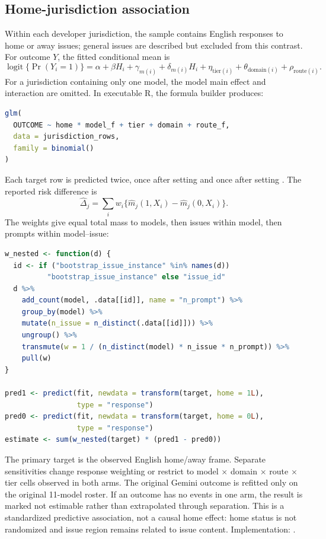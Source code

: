 \documentclass[11pt]{article}
\DeclareRobustCommand{\file}[1]{\texttt{\seqsplit{#1}}}
\DeclareRobustCommand{\code}[1]{\texttt{\seqsplit{#1}}}
\begin{document}
\subsection{Home-jurisdiction association}

Within each developer jurisdiction, the sample contains English responses to
home or away issues; general issues are described but excluded from this
contrast. For outcome \(Y\), the fitted conditional mean is
\[
  \operatorname{logit}\{\Pr(Y_i=1)\}
  =\alpha+\beta H_i+\gamma_{m(i)}
   +\delta_{m(i)}H_i+\eta_{\mathrm{tier}(i)}
   +\theta_{\mathrm{domain}(i)}+\rho_{\mathrm{route}(i)}.
\]
For a jurisdiction containing only one model, the model main effect and
interaction are omitted. In executable R, the formula builder produces:

\begin{lstlisting}[language=R]
glm(
  OUTCOME ~ home * model_f + tier + domain + route_f,
  data = jurisdiction_rows,
  family = binomial()
)
\end{lstlisting}

Each target row is predicted twice, once after setting \code{home=1} and once
after setting \code{home=0}. The reported risk difference is
\[
 \widehat\Delta_j=\sum_i w_i\{
   \widehat m_j(1,X_i)-\widehat m_j(0,X_i)\}.
\]
The weights give equal total mass to models, then issues within model, then
prompts within model--issue:

\begin{lstlisting}[language=R]
w_nested <- function(d) {
  id <- if ("bootstrap_issue_instance" %in% names(d))
          "bootstrap_issue_instance" else "issue_id"
  d %>%
    add_count(model, .data[[id]], name = "n_prompt") %>%
    group_by(model) %>%
    mutate(n_issue = n_distinct(.data[[id]])) %>%
    ungroup() %>%
    transmute(w = 1 / (n_distinct(model) * n_issue * n_prompt)) %>%
    pull(w)
}

pred1 <- predict(fit, newdata = transform(target, home = 1L),
                 type = "response")
pred0 <- predict(fit, newdata = transform(target, home = 0L),
                 type = "response")
estimate <- sum(w_nested(target) * (pred1 - pred0))
\end{lstlisting}

The primary target is the observed English home/away frame. Separate
sensitivities change response weighting or restrict to model \(\times\) domain
\(\times\) route \(\times\) tier cells observed in both arms. The original
Gemini outcome is refitted only on the original 11-model roster. If an outcome
has no events in one arm, the result is marked not estimable rather than
extrapolated through separation. This is a standardized predictive association,
not a causal home effect: home status is not randomized and issue region remains
related to issue content. Implementation:
\file{pipeline/11\_canonical\_home.R}.
\end{document}
